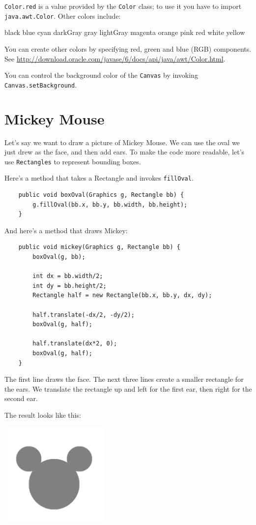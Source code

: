 \documentclass[12pt]{book}
\theoremstyle{exercise}
\begin{document}
{\tt Color.red} is a value provided by the {\tt Color}
class; to use it you have to import {\tt java.awt.Color}.
Other colors include:

\begin{verbatimtab}
black     blue    cyan   darkGray   gray   lightGray
magenta   orange  pink   red        white  yellow
\end{verbatimtab}
%
You can create other colors by specifying red, green and blue (RGB)
components.
See \url{http://download.oracle.com/javase/6/docs/api/java/awt/Color.html}.

You can control the background color of the {\tt Canvas} by
invoking {\tt Canvas.setBackground}.


\section{Mickey Mouse}

Let's say we want to draw a picture of Mickey Mouse.  We can use the
oval we just drew as the face, and then add ears.  To make the code
more readable, let's use {\tt Rectangles} to represent bounding boxes.

Here's a method that takes a Rectangle and invokes {\tt fillOval}.

\begin{lstlisting}
    public void boxOval(Graphics g, Rectangle bb) {
        g.fillOval(bb.x, bb.y, bb.width, bb.height);
    }
\end{lstlisting}

And here's a method that draws Mickey:

\begin{lstlisting}
    public void mickey(Graphics g, Rectangle bb) {
        boxOval(g, bb);

        int dx = bb.width/2;
        int dy = bb.height/2;
        Rectangle half = new Rectangle(bb.x, bb.y, dx, dy);

        half.translate(-dx/2, -dy/2);
        boxOval(g, half);

        half.translate(dx*2, 0);
        boxOval(g, half);
    }
\end{lstlisting}

The first line draws the face.  The next three lines create
a smaller rectangle for the ears.  We translate the rectangle
up and left for the first ear, then right for the second ear.

The result looks like this:

\includegraphics[height=2in]{figs/mickey.pdf}
\end{document}
